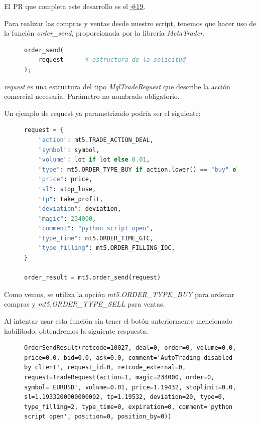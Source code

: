 El PR que completa este desarrollo es el \href{https://github.com/mcarmona99/TFG/pull/19}{\#19}. \newline

Para realizar las compras y ventas desde nuestro script, tenemos que hacer uso de la función \textit{order\_send}, proporcionada por la librería \textit{MetaTrader}.

\begin{figure}[h]
	\begin{lstlisting}[language=Python]
order_send(
	request      # estructura de la solicitud
);
	\end{lstlisting}
\end{figure}


\textit{request} es una estructura del tipo \textit{MqlTradeRequest} que describe la acción comercial necesaria. Parámetro no nombrado obligatorio.  \newline

Un ejemplo de request ya parametrizado podría ser el siguiente:\newline

\begin{figure}[h]
	\begin{lstlisting}[language=Python]
request = {
	"action": mt5.TRADE_ACTION_DEAL,
	"symbol": symbol,
	"volume": lot if lot else 0.01,
	"type": mt5.ORDER_TYPE_BUY if action.lower() == "buy" else mt5.ORDER_TYPE_SELL,
	"price": price,
	"sl": stop_lose,
	"tp": take_profit,
	"deviation": deviation,
	"magic": 234000,
	"comment": "python script open",
	"type_time": mt5.ORDER_TIME_GTC,
	"type_filling": mt5.ORDER_FILLING_IOC,
}

order_result = mt5.order_send(request)
	\end{lstlisting}
\end{figure}

Como vemos, se utiliza la opción \textit{mt5.ORDER\_TYPE\_BUY} para ordenar compras y \textit{mt5.ORDER\_TYPE\_SELL} para ventas.

Al intentar usar esta función sin tener el botón anteriormente mencionado habilitado, obtendremos la siguiente respuesta:\newline

\begin{figure}[h]
	\begin{lstlisting}
OrderSendResult(retcode=10027, deal=0, order=0, volume=0.0, price=0.0, bid=0.0, ask=0.0, comment='AutoTrading disabled by client', request_id=0, retcode_external=0, request=TradeRequest(action=1, magic=234000, order=0, symbol='EURUSD', volume=0.01, price=1.19432, stoplimit=0.0, sl=1.1933200000000002, tp=1.19532, deviation=20, type=0, type_filling=2, type_time=0, expiration=0, comment='python script open', position=0, position_by=0))
	\end{lstlisting}
\end{figure}

